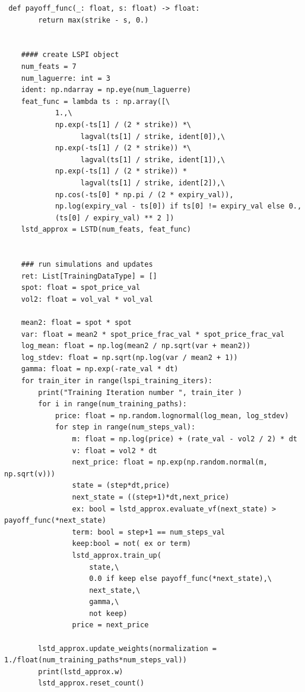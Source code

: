 \documentclass{article}[12pt]
\begin{document}
\begin{lstlisting}
 def payoff_func(_: float, s: float) -> float:
        return max(strike - s, 0.)


    #### create LSPI object
    num_feats = 7
    num_laguerre: int = 3
    ident: np.ndarray = np.eye(num_laguerre)
    feat_func = lambda ts : np.array([\
            1.,\
            np.exp(-ts[1] / (2 * strike)) *\
                  lagval(ts[1] / strike, ident[0]),\
            np.exp(-ts[1] / (2 * strike)) *\
                  lagval(ts[1] / strike, ident[1]),\
            np.exp(-ts[1] / (2 * strike)) *
                  lagval(ts[1] / strike, ident[2]),\
            np.cos(-ts[0] * np.pi / (2 * expiry_val)),
            np.log(expiry_val - ts[0]) if ts[0] != expiry_val else 0.,
            (ts[0] / expiry_val) ** 2 ])
    lstd_approx = LSTD(num_feats, feat_func)


    ### run simulations and updates
    ret: List[TrainingDataType] = []
    spot: float = spot_price_val
    vol2: float = vol_val * vol_val

    mean2: float = spot * spot
    var: float = mean2 * spot_price_frac_val * spot_price_frac_val
    log_mean: float = np.log(mean2 / np.sqrt(var + mean2))
    log_stdev: float = np.sqrt(np.log(var / mean2 + 1))
    gamma: float = np.exp(-rate_val * dt)
    for train_iter in range(lspi_training_iters):
        print("Training Iteration number ", train_iter )
        for i in range(num_training_paths):
            price: float = np.random.lognormal(log_mean, log_stdev)
            for step in range(num_steps_val):
                m: float = np.log(price) + (rate_val - vol2 / 2) * dt
                v: float = vol2 * dt
                next_price: float = np.exp(np.random.normal(m, np.sqrt(v)))
                state = (step*dt,price)
                next_state = ((step+1)*dt,next_price)
                ex: bool = lstd_approx.evaluate_vf(next_state) > payoff_func(*next_state)
                term: bool = step+1 == num_steps_val
                keep:bool = not( ex or term)
                lstd_approx.train_up(
                    state,\
                    0.0 if keep else payoff_func(*next_state),\
                    next_state,\
                    gamma,\
                    not keep)
                price = next_price

        lstd_approx.update_weights(normalization = 1./float(num_training_paths*num_steps_val))
        print(lstd_approx.w)
        lstd_approx.reset_count()
\end{lstlisting}
\end{document}
